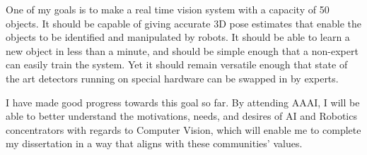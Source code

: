 \documentclass[12pt]{article}
\numberwithin{equation}{section}
\numberwithin{table}{section}
\numberwithin{figure}{section}
\begin{document}
  One of my goals is to make a real time vision system with a capacity of 50 objects. It should be
capable of giving accurate 3D pose estimates that enable the objects to be identified and manipulated
by robots. It should be able to learn a new object in less than a minute, and should be simple enough
that a non-expert can easily train the system. Yet it should remain versatile enough that state of
the art detectors running on special hardware can be swapped in by experts.
  
  I have made good progress towards this goal so far. By attending AAAI, I will be able to
better understand the motivations, needs, and desires of AI and Robotics concentrators with regards
to Computer Vision, which will enable me to complete my dissertation in a way that aligns with
these communities' values.

\newpage
\end{document}
